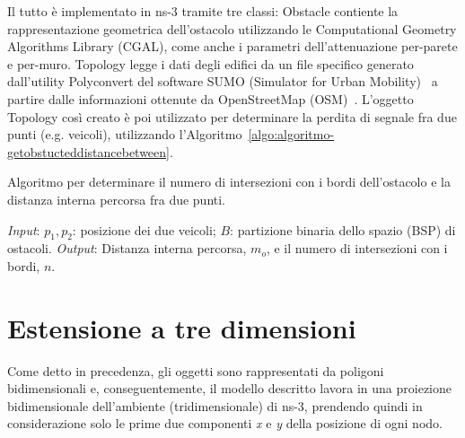 Il tutto è implementato in ns-3 tramite tre classi: \textsf{Obstacle} contiente la rappresentazione geometrica dell'ostacolo utilizzando le Computational Geometry Algorithms Library (CGAL),
come anche i parametri dell'attenuazione per-parete e per-muro.
\textsf{Topology} legge i dati degli edifici da un file specifico generato dall'utility Polyconvert del software SUMO (Simulator for Urban Mobility)~\cite{sumoWebsite}
a partire dalle informazioni ottenute da OpenStreetMap (OSM)~\cite{osmWebsite}.
L'oggetto \textsf{Topology} così creato è poi utilizzato per determinare la perdita di segnale fra due punti (e.g. veicoli), utilizzando l'Algoritmo~\ref{algo:algoritmo-getobstucteddistancebetween}.
%
\begin{italianalgorithm}[h]
\caption{Algoritmo per determinare il numero di intersezioni con i bordi dell'ostacolo e la distanza interna percorsa fra due punti.}\label{algo:algoritmo-getobstucteddistancebetween}
\begin{algorithmic}[1]
	\BState{}\emph{Input}: $p_1, p_2$: posizione dei due veicoli; $B$: partizione binaria dello spazio (BSP) di ostacoli.
	\BState{}\emph{Output}: Distanza interna percorsa, $m_o$, e il numero di intersezioni con i bordi, $n$.
			\label{algo:line:getobstucteddistancebetween-interesezione}
				\EndIf{}
			\EndFor{}
		\EndIf{}
	\EndFor{}
	\EndProcedure{}
\end{algorithmic}
\end{italianalgorithm}
%
\section{Estensione a tre dimensioni}\label{sec:estensione-a-tre-dimensioni}
Come detto in precedenza, gli oggetti sono rappresentati da poligoni bidimensionali e, conseguentemente,
il modello descritto lavora in una proiezione bidimensionale dell'ambiente (tridimensionale) di ns-3,
prendendo quindi in considerazione solo le prime due componenti \textit{x} e \textit{y} della posizione di ogni nodo.

